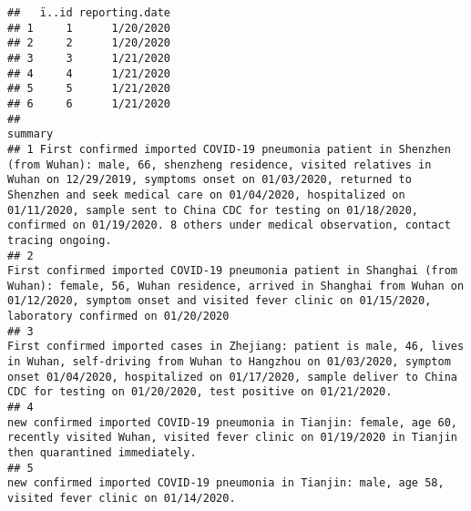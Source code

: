 \documentclass[
]{article}
\begin{document}
\begin{verbatim}
##   ï..id reporting.date
## 1     1      1/20/2020
## 2     2      1/20/2020
## 3     3      1/21/2020
## 4     4      1/21/2020
## 5     5      1/21/2020
## 6     6      1/21/2020
##                                                                                                                                                                                                                                                                                                                                                                                                                summary
## 1 First confirmed imported COVID-19 pneumonia patient in Shenzhen (from Wuhan): male, 66, shenzheng residence, visited relatives in Wuhan on 12/29/2019, symptoms onset on 01/03/2020, returned to Shenzhen and seek medical care on 01/04/2020, hospitalized on 01/11/2020, sample sent to China CDC for testing on 01/18/2020, confirmed on 01/19/2020. 8 others under medical observation, contact tracing ongoing.
## 2                                                                                                                                                                    First confirmed imported COVID-19 pneumonia patient in Shanghai (from Wuhan): female, 56, Wuhan residence, arrived in Shanghai from Wuhan on 01/12/2020, symptom onset and visited fever clinic on 01/15/2020, laboratory confirmed on 01/20/2020
## 3                                                                                                                                        First confirmed imported cases in Zhejiang: patient is male, 46, lives in Wuhan, self-driving from Wuhan to Hangzhou on 01/03/2020, symptom onset 01/04/2020, hospitalized on 01/17/2020, sample deliver to China CDC for testing on 01/20/2020, test positive on 01/21/2020.
## 4                                                                                                                                                                                                                                            new confirmed imported COVID-19 pneumonia in Tianjin: female, age 60, recently visited Wuhan, visited fever clinic on 01/19/2020 in Tianjin then quarantined immediately.
## 5                                                                                                                                                                                                                                                                                                              new confirmed imported COVID-19 pneumonia in Tianjin: male, age 58, visited fever clinic on 01/14/2020.

\end{verbatim}
\end{document}
